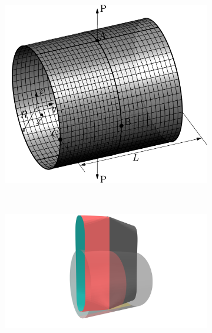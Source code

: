\begin{figure}[h]
	\center
	\begin{subfigure}[b]{\textwidth}
		\centering
		\includegraphics[width=.55\textwidth]{cylindrical_configuration}
		\caption{}\label{fig:cylindrical_pull_config}
	\end{subfigure}
	\\\hspace{1em}
	\begin{subfigure}[b]{.45\textwidth}
		\centering
		\includegraphics[scale=.2,trim={18cm 3cm 18cm 0cm},clip]{cylindrical_deformed}
		\caption{}
	\end{subfigure}
	\begin{subfigure}[b]{.45\textwidth}

\end{subfigure}
\end{figure}
